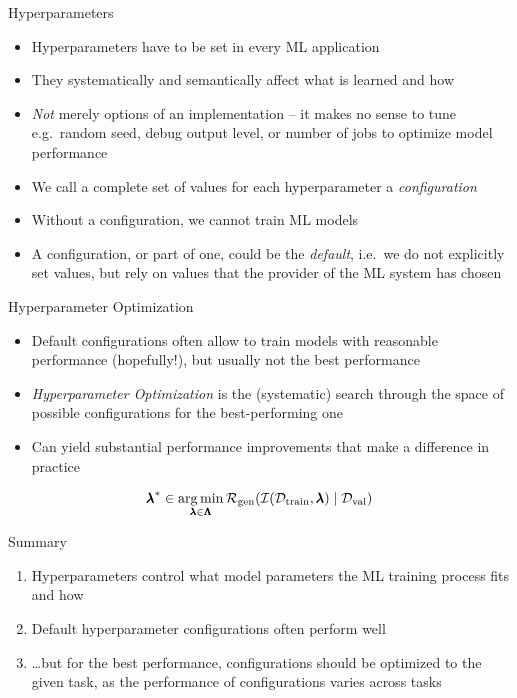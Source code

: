 \documentclass[main]{subfiles}
\begin{document}
\begin{frame}{Hyperparameters}
    \begin{itemize}
        \item Hyperparameters have to be set in every ML application
        \item They systematically and semantically affect what is learned and how
        \item \emph{Not} merely options of an implementation -- it makes no sense to tune e.g.\ random seed, debug output level, or number of jobs to optimize model performance
        \item We call a complete set of values for each hyperparameter a \emph{configuration}
        \item Without a configuration, we cannot train ML models
        \item A configuration, or part of one, could be the \emph{default}, i.e.\ we do not explicitly set values, but rely on values that the provider of the ML system has chosen
    \end{itemize}
\end{frame}


\begin{frame}{Hyperparameter Optimization}
    \begin{itemize}
        \item Default configurations often allow to train models with reasonable performance (hopefully!), but usually not the best performance
        \item \emph{Hyperparameter Optimization} is the (systematic) search through the space of possible configurations for the best-performing one
        \item Can yield substantial performance improvements that make a difference in practice
    \end{itemize}
    
    $${\pmb{\lambda}}^* \in \operatorname*{arg\,min}_{\pmb{\lambda} \in \pmb{\Lambda}} \mathcal{R}_{\text{gen}}(\mathcal{I}(\mathcal{D}_{\text{train}}, \pmb{\lambda}) \mid \mathcal{D}_{\text{val}})$$
\end{frame}


\begin{frame}{Summary} 
\begin{enumerate}
    \item Hyperparameters control what model parameters the ML training process fits and how
    \item Default hyperparameter configurations often perform well
    \item \ldots{}but for the best performance, configurations should be optimized to the given task, as the performance of configurations varies across tasks
\end{enumerate}
\end{frame}
\end{document}
